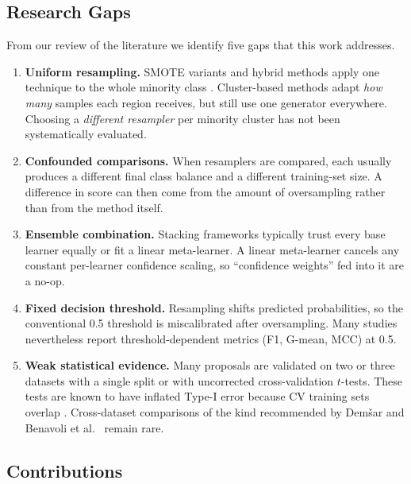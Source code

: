 \documentclass[11pt,a4paper]{article}
\begin{document}
\subsection{Research Gaps}

From our review of the literature we identify five gaps that this work addresses.
\begin{enumerate}
  \item[\textbf{G1}] \textbf{Uniform resampling.} SMOTE variants and hybrid methods apply one technique to the whole minority class \cite{chawla2002smote,he2008adasyn,batista2004study}. Cluster-based methods \cite{douzas2018kmeanssmote} adapt \emph{how many} samples each region receives, but still use one generator everywhere. Choosing a \emph{different resampler} per minority cluster has not been systematically evaluated.
  \item[\textbf{G2}] \textbf{Confounded comparisons.} When resamplers are compared, each usually produces a different final class balance and a different training-set size. A difference in score can then come from the amount of oversampling rather than from the method itself.
  \item[\textbf{G3}] \textbf{Ensemble combination.} Stacking frameworks typically trust every base learner equally or fit a linear meta-learner. A linear meta-learner cancels any constant per-learner confidence scaling, so ``confidence weights'' fed into it are a no-op.
  \item[\textbf{G4}] \textbf{Fixed decision threshold.} Resampling shifts predicted probabilities, so the conventional 0.5 threshold is miscalibrated after oversampling. Many studies nevertheless report threshold-dependent metrics (F1, G-mean, MCC) at 0.5.
  \item[\textbf{G5}] \textbf{Weak statistical evidence.} Many proposals are validated on two or three datasets with a single split or with uncorrected cross-validation $t$-tests. These tests are known to have inflated Type-I error because CV training sets overlap \cite{nadeau2003inference}. Cross-dataset comparisons of the kind recommended by Dem{\v{s}}ar \cite{demsar2006statistical} and Benavoli et al.\ \cite{benavoli2016posthoc} remain rare.
\end{enumerate}

\subsection{Contributions}
\end{document}
